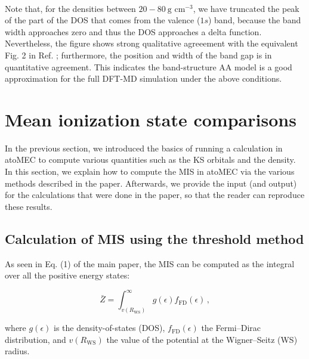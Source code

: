 \documentclass[11pt]{article}
\begin{document}
    \begin{center}
    \end{center}
    { \hspace*{\fill} \\}
    
    Note that, for the densities between \(20-80\ \textrm{g cm}^{-3}\), we
have truncated the peak of the part of the DOS that comes from the
valence (\(1s\)) band, because the band width approaches zero and thus
the DOS approaches a delta function. Nevertheless, the figure shows
strong qualitative agreeement with the equivalent Fig. 2 in Ref.
; furthermore, the position and width
of the band gap is in quantitative agreement. This indicates the
band-structure AA model is a good approximation for the full DFT-MD
simulation under the above conditions.

    \hypertarget{mean-ionization-state-comparisons}{%
\section{Mean ionization state
comparisons}\label{mean-ionization-state-comparisons}}

In the previous section, we introduced the basics of running a
calculation in atoMEC to compute various quantities such as the KS
orbitals and the density. In this section, we explain how to compute the
MIS in atoMEC via the various methods described in the paper.
Afterwards, we provide the input (and output) for the calculations that
were done in the paper, so that the reader can reproduce these results.

\hypertarget{calculation-of-mis-using-the-threshold-method}{%
\subsection{Calculation of MIS using the threshold
method}\label{calculation-of-mis-using-the-threshold-method}}

As seen in Eq. (1) of the main paper, the MIS can be computed as the
integral over all the positive energy states:

\begin{equation}
\bar{Z} = \int_{v(R_\textrm{WS})}^\infty g(\epsilon) f_\textrm{FD}(\epsilon)\,,
\end{equation}

where \(g(\epsilon)\) is the density-of-states (DOS),
\(f_\textrm{FD}(\epsilon)\) the Fermi--Dirac distribution, and
\(v(R_\textrm{WS})\) the value of the potential at the Wigner--Seitz
(WS) radius.
\end{document}
